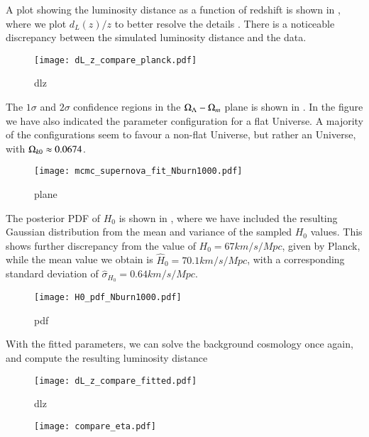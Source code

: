 A plot showing the luminosity distance as a function of redshift is shown in , where we plot $d_L(z)/z$ to better resolve the details . There is a noticeable discrepancy between the simulated luminosity distance and the data.      
\begin{figure}[ht!]
    \texttt{[image: dL\_z\_compare\_planck.pdf]}
    \caption{dlz}
    \label{fig:M1:dL_of_z_data_vs_Planck}
\end{figure}

The $1\sigma$ and $2\sigma$ confidence regions in the $\Omega_{\Lambda}-\Omega_{m}$ plane is shown in . In the figure we have also indicated the parameter configuration for a flat Universe. A majority of the configurations seem to favour a non-flat Universe, but rather an  Universe, with $\Omega_{k0}\approx 0.0674$.     
\begin{figure}[ht!]
    \texttt{[image: mcmc\_supernova\_fit\_Nburn1000.pdf]}
    \caption{plane}
    \label{fig:M1:oM_oL_plane}
\end{figure}

The posterior PDF of $H_0$ is shown in , where we have included the resulting Gaussian distribution from the mean and variance of the sampled $H_0$ values. This shows further discrepancy from the value of $H_0=67\unit{km/s/Mpc}$, given by Planck, while the mean value we obtain is $\hat{H}_0=70.1\unit{km/s/Mpc}$, with a corresponding standard deviation of $\hat{\sigma}_{H_0}=0.64\unit{km/s/Mpc}$.       
\begin{figure}[ht!]
    \texttt{[image: H0\_pdf\_Nburn1000.pdf]}    
    \caption{pdf}
    \label{fig:M1:H0_posterior_pdf}
\end{figure}


With the fitted parameters, we can solve the background cosmology once again, and compute the resulting luminosity distance  
\begin{figure}[ht!]
    \texttt{[image: dL\_z\_compare\_fitted.pdf]}
    \caption{dlz}
    \label{fig:M1:dL_of_z_data_vs_bestfit}
\end{figure}

\begin{figure}[ht!]
    \texttt{[image: compare\_eta.pdf]}
    \caption{}
    \label{fig:M1:eta}
\end{figure}



% 
